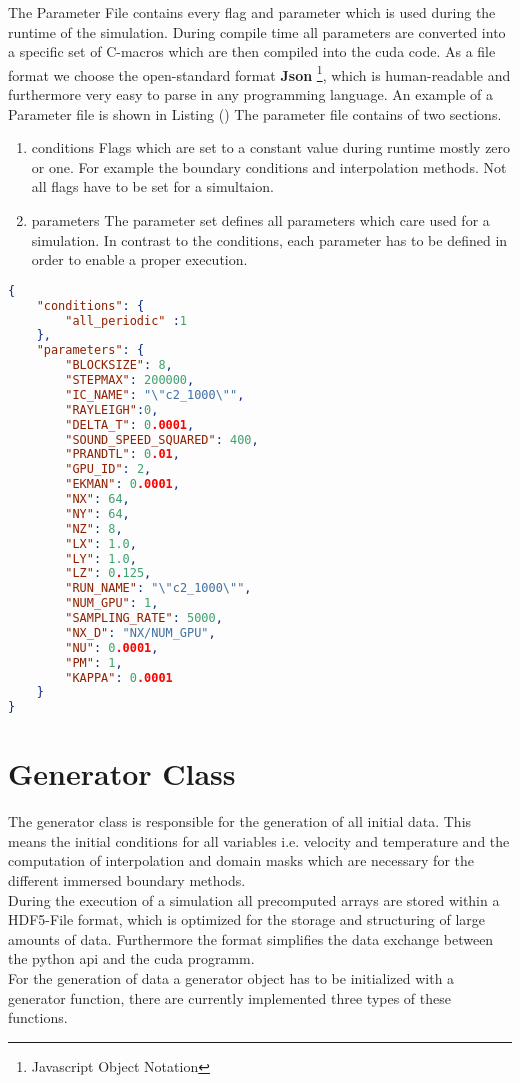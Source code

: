 The Parameter File contains every flag and parameter which is used during the runtime of the simulation.
During compile time all parameters are converted into a specific set of C-macros which are then compiled
into the cuda code. As a file format we choose the open-standard format \textbf{Json} \footnote{Javascript Object Notation},
which is human-readable and furthermore very easy to parse in any programming language.
An example of a Parameter file is shown in Listing ()
The parameter file contains of two sections.
\begin{enumerate}
\item{conditions} Flags which are set to a constant value during runtime mostly zero or one. For example the boundary conditions and
                  interpolation methods. Not all flags have to be set for a simultaion.
\item{parameters} The parameter set defines all parameters which care used  for a simulation. In contrast to the conditions, each
                  parameter has to be defined in order to enable a proper execution.
\end{enumerate}
\begin{minipage}{\linewidth}
\begin{lstlisting}[language=json,firstnumber=1, caption='Example of a "paramater.json" file.]
{
    "conditions": {
        "all_periodic" :1
    },
    "parameters": {
        "BLOCKSIZE": 8,
        "STEPMAX": 200000,
        "IC_NAME": "\"c2_1000\"",
        "RAYLEIGH":0,
        "DELTA_T": 0.0001,
        "SOUND_SPEED_SQUARED": 400,
        "PRANDTL": 0.01,
        "GPU_ID": 2,
        "EKMAN": 0.0001,
        "NX": 64,
        "NY": 64,
        "NZ": 8,
        "LX": 1.0,
        "LY": 1.0,
        "LZ": 0.125,
        "RUN_NAME": "\"c2_1000\"",
        "NUM_GPU": 1,
        "SAMPLING_RATE": 5000,
        "NX_D": "NX/NUM_GPU",
        "NU": 0.0001,
        "PM": 1,
        "KAPPA": 0.0001
    }
}
\end{lstlisting}
\end{minipage}

\section{Generator Class}

The generator class is responsible for the generation of all initial data.
This means the initial conditions for all variables i.e. velocity and temperature
and the computation of interpolation and domain masks which are necessary for the different
immersed boundary methods.\\
During the execution of a simulation all precomputed arrays are stored within a
HDF5-File format, which is optimized for the storage and structuring of large amounts of data.
Furthermore the format simplifies the data exchange between the python api and the cuda programm.\\
For the generation of data a generator object has to be initialized with a generator function,
there are currently implemented three types of these functions.

